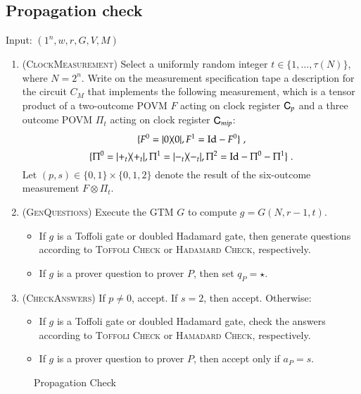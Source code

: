 \subsection{Propagation check}
\label{sec:prop_check}

\vspace{10pt}
\begin{center}
\begin{mdframed}
    Input: $(1^n,w,r,G,V,M)$
	\begin{enumerate}
		\item (\textsc{ClockMeasurement}) Select a uniformly random integer $t\in\{1,\ldots, \tau(N)\}$, where $N = 2^n$. Write on the measurement specification tape a description for the circuit $C_M$ that implements the following measurement, which is a tensor product of a two-outcome POVM $F$ acting on clock register ${\textsf{C}}_p$ and a three outcome POVM $\Pi_t$ acting on clock register ${\textsf{C}}_{mip}$: 
\[
	\{F^0 = |0\rangle\! \langle 0|, F^1 = \mathop{\mathrm{Id}}\!\mathinner{} - F^0 \}\;,
\]
\[
	\{ 	\Pi^0 = |+_t\rangle\! \langle +_t|, 
	\Pi^1 = |-_t\rangle\! \langle -_t|, 
	\Pi^2 = \mathop{\mathrm{Id}}\!\mathinner{} - \Pi^0 - \Pi^1 \}\;.
\]	
Let $(p,s) \in \{0,1\} \times \{0,1,2\}$ denote the result of the six-outcome measurement $F \otimes \Pi_t$.

	\item (\textsc{GenQuestions}) Execute the GTM $G$ to compute $g = G(N,r-1,t)$. 
	\begin{itemize}
		\item If $g$ is a Toffoli gate or doubled Hadamard gate, then generate questions according to \textsc{Toffoli Check} or \textsc{Hadamard Check}, respectively. 
		\item If $g$ is a prover question to prover $P$, then set $q_P = \star$.
	\end{itemize}
		\item (\textsc{CheckAnswers}) If $p \neq 0$, accept. If $s = 2$, then accept. Otherwise:
		\begin{itemize}
			\item If $g$ is a Toffoli gate or doubled Hadamard gate, check the answers according to \textsc{Toffoli Check} or \textsc{Hamadard Check}, respectively. 
			\item If $g$ is a prover question to prover $P$, then accept only if $a_P = s$. 
		\end{itemize}
	\end{enumerate}    
\end{mdframed}

\end{center}
\begin{figure}[H]
\caption{Propagation Check}
\label{fig:prop_check}
\end{figure}

